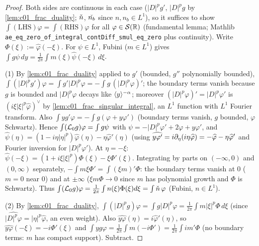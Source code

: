 \begin{proof}
  Both sides are continuous in each case ($|D|^pg'$, $|D|^pg$ by \cref{lem:c01_frac_duality}; $\widecheck n$,
  $\widecheck{n_b}$ since $n,n_b\in L^1$), so it suffices to show $\int(\text{LHS})\varphi=\int(\text{RHS})\varphi$
  for all $\varphi\in\mathcal S(\R)$ (fundamental lemma; Mathlib
  \texttt{ae\_eq\_zero\_of\_integral\_contDiff\_smul\_eq\_zero} plus continuity). Write $\Phi(\xi):=\widehat\varphi(-\xi)$.
  For $\psi\in L^1$, Fubini ($m\in L^1$) gives $\int g\psi\,dy=\frac1{2\pi}\int m(\xi)\widehat\psi(-\xi)\,d\xi$.

  (1) By \cref{lem:c01_frac_duality} applied to $g'$ (bounded, $g''$ polynomially bounded),
  $\int(|D|^pg')\varphi=\int g'|D|^p\varphi=-\int g\,(|D|^p\varphi)'$; the boundary terms vanish because $g$ is
  bounded and $|D|^p\varphi$ decays like $\ang y^{-\alpha}$; moreover $(|D|^p\varphi)'=|D|^p\varphi'$ is
  $(i\xi|\xi|^p\widehat\varphi)^\vee$ by \cref{lem:c01_frac_singular_integral}, an $L^1$ function with
  $L^1$ Fourier transform. Also $\int yg'\varphi=-\int g(\varphi+y\varphi')$ (boundary terms vanish, $g$ bounded,
  $\varphi$ Schwartz). Hence $\int(\mc L_0g)\varphi=\int g\psi$ with $\psi=-|D|^p\varphi'+2\varphi+y\varphi'$, and
  $\widehat\psi(\eta)=(1-i\eta|\eta|^p)\widehat\varphi(\eta)-\eta\widehat\varphi'(\eta)$ (using
  $\widehat{y\varphi'}=i\p_\eta(i\eta\widehat\varphi)=-\widehat\varphi-\eta\widehat\varphi'$ and Fourier inversion for
  $|D|^p\varphi'$). At $\eta=-\xi$: $\widehat\psi(-\xi)=(1+i\xi|\xi|^p)\Phi(\xi)-\xi\Phi'(\xi)$. Integrating by parts
  on $(-\infty,0)$ and $(0,\infty)$ separately, $-\int m\xi\Phi'=\int(\xi m)'\Phi$: the boundary terms vanish at $0$
  ($m=0$ near $0$) and at $\pm\infty$ ($\xi m\Phi\to0$ since $m$ has polynomial growth and $\Phi$ is Schwartz).
  Thus $\int(\mc L_0g)\varphi=\frac1{2\pi}\int n(\xi)\Phi(\xi)d\xi=\int\widecheck n\,\varphi$ (Fubini, $n\in L^1$).

  (2) By \cref{lem:c01_frac_duality}, $\int(|D|^pg)\varphi=\int g|D|^p\varphi=\frac1{2\pi}\int m|\xi|^p\Phi\,d\xi$
  (since $\widehat{|D|^p\varphi}=|\eta|^p\widehat\varphi$, an even weight). Also
  $\widehat{y\varphi}(\eta)=i\widehat\varphi'(\eta)$, so $\widehat{y\varphi}(-\xi)=-i\Phi'(\xi)$ and
  $\int yg\varphi=\frac1{2\pi}\int m(-i\Phi')=\frac1{2\pi}\int im'\Phi$ (no boundary terms: $m$ has compact
  support). Subtract.
\end{proof}


